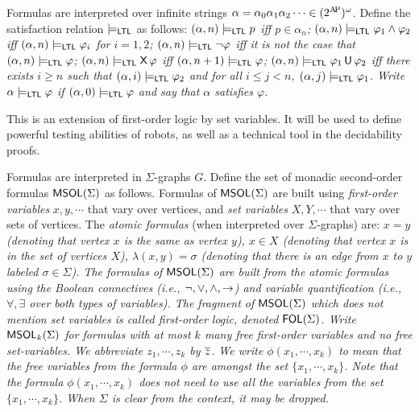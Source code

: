 	
	Formulas are interpreted over infinite strings $\alpha = \alpha_0 \alpha_1 \alpha_2 \cdots \in (2^{\mathrm{A\!P}})^\omega$. Define the satisfaction relation
	$\models_\mathsf{LTL}$ as follows:
	\it
	\- $(\alpha,n) \models_\mathsf{LTL} p$ iff $p \in \alpha_n$;
	\- $(\alpha,n) \models_\mathsf{LTL} \varphi_1 \wedge \varphi_2$ iff $(\alpha,n) \models_\mathsf{LTL} \varphi_i$ for $i = 1,2$;
	\-	$(\alpha,n) \models_\mathsf{LTL} \neg \varphi$ iff it is not the case that $(\alpha,n) \models_\mathsf{LTL} \varphi$;
	\-  $(\alpha,n) \models_\mathsf{LTL} \operatorname{\mathsf{X}} \varphi$ iff $(\alpha,n+1) \models_\mathsf{LTL} \varphi$;
	\- $(\alpha,n) \models_\mathsf{LTL} \varphi_1 \operatorname{\mathbin{\mathsf{U}}} \varphi_2$ iff there exists $i \geq n$ such that $(\alpha,i) \models_\mathsf{LTL} \varphi_2$ and for all $i \leq j < n$, $(\alpha,j) \models_\mathsf{LTL} \varphi_1$.
	\ti
	Write $\alpha \models_\mathsf{LTL} \varphi$ if $(\alpha,0) \models_\mathsf{LTL} \varphi$ and say that $\alpha$ \emph{satisfies} $\varphi$.



   \label{dfn:msol} This is an extension of first-order logic by set variables. It will be used to define powerful testing abilities of robots, as well as a technical tool in the decidability proofs.

Formulas are interpreted in $\Sigma$-graphs $G$. Define the set of monadic second-order formulas $\mathsf{MSOL}(\Sigma)$ as follows. Formulas of $\mathsf{MSOL}(\Sigma)$ are built using {\em first-order variables} $x,y,\cdots$ that vary over vertices, and {\em set variables} $X,Y, \cdots$ that vary over sets of vertices. The {\em atomic formulas} (when interpreted over $\Sigma$-graphs) are:
\it
\- $x = y$ (denoting that vertex $x$ is the same as vertex $y$),
\- $x \in X$ (denoting that vertex $x$ is in the set of vertices $X$),
\- $\lambda(x,y) = \sigma$ (denoting that there is an edge from $x$ to $y$ labeled $\sigma \in \Sigma$).
\ti
The formulas of $\mathsf{MSOL}(\Sigma)$ are built from the atomic  formulas using the Boolean connectives (i.e., $\neg,\vee, \wedge, \rightarrow$) and variable quantification (i.e., $\forall,\exists$ over both types of variables). The fragment of $\mathsf{MSOL}(\Sigma)$ which does not mention set variables is called {\em first-order logic}, denoted $\mathsf{FOL}(\Sigma)$.
Write $\mathsf{MSOL}_k(\Sigma)$ for formulas with at most $k$ many free first-order variables and no free set-variables. We abbreviate $z_1, \cdots, z_k$ by $\overline{z}$. We write $\phi(x_1, \cdots, x_k)$ to mean that the free variables from the formula $\phi$ are amongst the set $\{x_1, \cdots, x_k\}$. Note that the formula $\phi(x_1,\cdots,x_k)$ does not need to use all the variables from the set $\{x_1,\cdots,x_k\}$. When $\Sigma$ is clear from the context, it may be dropped.

